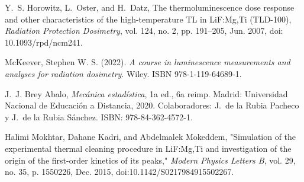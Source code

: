 
\begin{thebibliography}{999}

 Y.~S. Horowitz, L.~Oster, and H.~Datz, The thermoluminescence dose response and other characteristics of the high-temperature TL in LiF:Mg,Ti (TLD-100), \textit{Radiation Protection Dosimetry}, vol. 124, no. 2, pp. 191--205, Jun. 2007, doi: 10.1093/rpd/ncm241.

McKeever, Stephen W. S. (2022). \textit{A course in luminescence measurements and analyses for radiation dosimetry}. Wiley. ISBN 978-1-119-64689-1.

J.~J. Brey Abalo, \emph{Mecánica estadística}, 1a ed., 6a reimp. Madrid: Universidad Nacional de Educación a Distancia, 2020. 
Colaboradores: J.~de la Rubia Pacheco y J.~de la Rubia Sánchez. 
ISBN: 978-84-362-4572-1. 

Halimi Mokhtar, Dahane Kadri, and Abdelmalek Mokeddem,
"Simulation of the experimental thermal cleaning procedure in LiF:Mg,Ti and investigation of the origin of the first-order kinetics of its peaks,"
\textit{Modern Physics Letters B}, vol. 29, no. 35, p. 1550226, Dec. 2015, doi:10.1142/S0217984915502267.



\end{thebibliography}